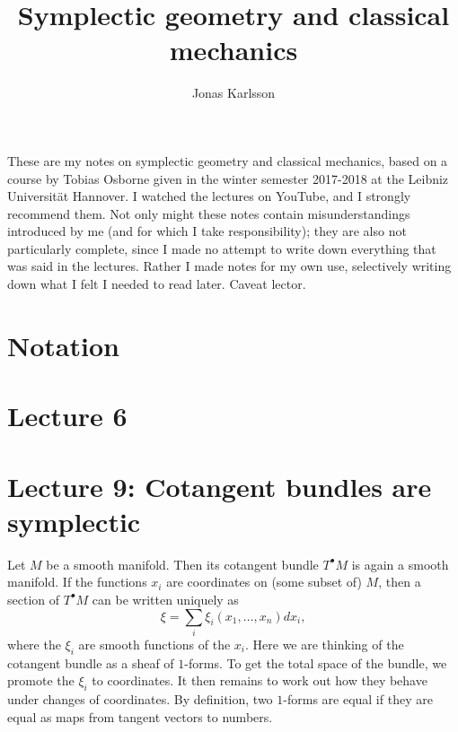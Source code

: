 \documentclass[11pt]{article} %
\title{Symplectic geometry and classical mechanics}
\author{Jonas Karlsson}
\begin{document}
\maketitle
These are my notes on symplectic geometry and classical mechanics, based on a course by Tobias Osborne given in the winter semester 2017-2018 at the Leibniz Universität Hannover. I watched the lectures on YouTube, and I strongly recommend them. Not only might these notes contain misunderstandings introduced by me (and for which I take responsibility); they are also not particularly complete, since I made no attempt to write down everything that was said in the lectures. Rather I made notes for my own use, selectively writing down what I felt I needed to read later. Caveat lector.

\section*{Notation}

\section*{}

\section*{}

\section*{}

\section*{Lecture 6}

\section*{}

\section*{}


\section*{Lecture 9: Cotangent bundles are symplectic}
Let $M$ be a smooth manifold. Then its cotangent bundle $T^\bullet M$ is again a smooth manifold. If the functions $x_i$ are coordinates on (some subset of) $M$, then a section of $T^\bullet M$ can be written uniquely as
$$
\xi = \sum_i \xi_i(x_1, \dots, x_n) dx_i,
$$
where the $\xi_i$ are smooth functions of the $x_i$. Here we are thinking of the cotangent bundle as a sheaf of $1$-forms. To get the total space of the bundle, we promote the $\xi_i$ to coordinates. It then remains to work out how they behave under changes of coordinates. By definition, two $1$-forms are equal if they are equal as maps from tangent vectors to numbers. 
\end{document}
